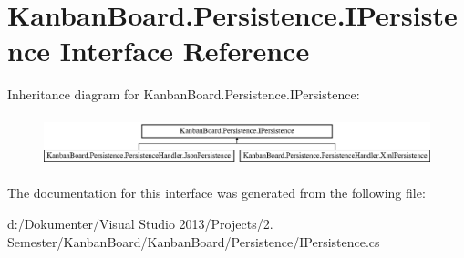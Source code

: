 \hypertarget{interface_kanban_board_1_1_persistence_1_1_i_persistence}{}\section{Kanban\+Board.\+Persistence.\+I\+Persistence Interface Reference}
\label{interface_kanban_board_1_1_persistence_1_1_i_persistence}
Inheritance diagram for Kanban\+Board.\+Persistence.\+I\+Persistence\+:\begin{figure}[H]
\begin{center}
\leavevmode
\includegraphics[height=1.477572cm]{interface_kanban_board_1_1_persistence_1_1_i_persistence}
\end{center}
\end{figure}


The documentation for this interface was generated from the following file\+:\begin{DoxyCompactItemize}
\item 
d\+:/\+Dokumenter/\+Visual Studio 2013/\+Projects/2. Semester/\+Kanban\+Board/\+Kanban\+Board/\+Persistence/I\+Persistence.\+cs\end{DoxyCompactItemize}

